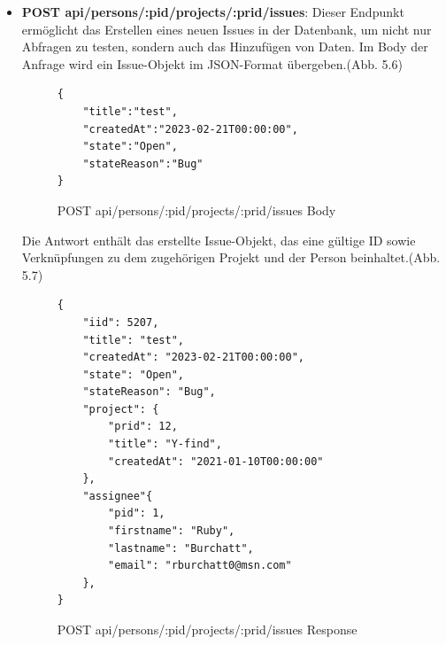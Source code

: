 \begin{itemize}
\item \textbf{POST api/persons/:pid/projects/:prid/issues}: Dieser Endpunkt ermöglicht das Erstellen eines neuen Issues in der Datenbank, um nicht nur Abfragen zu testen, sondern auch das Hinzufügen von Daten. Im Body der Anfrage wird ein Issue-Objekt im JSON-Format übergeben.(Abb. 5.6) 
\newline
\begin{figure}[H]
\begin{center}
\begin{BVerbatim}
{
    "title":"test",
    "createdAt":"2023-02-21T00:00:00",
    "state":"Open",
    "stateReason":"Bug"
}
\end{BVerbatim}
\end{center}
\caption{POST api/persons/:pid/projects/:prid/issues Body}
\end{figure}
Die Antwort enthält das erstellte Issue-Objekt, das eine gültige ID sowie Verknüpfungen zu dem zugehörigen Projekt und der Person beinhaltet.(Abb. 5.7)
\begin{figure}[H]
\begin{center}
\begin{BVerbatim}
{
    "iid": 5207,
    "title": "test",
    "createdAt": "2023-02-21T00:00:00",
    "state": "Open",
    "stateReason": "Bug",
    "project": {
        "prid": 12,
        "title": "Y-find",
        "createdAt": "2021-01-10T00:00:00"
    },
    "assignee"{
        "pid": 1,
        "firstname": "Ruby",
        "lastname": "Burchatt",
        "email": "rburchatt0@msn.com"
    },
}
\end{BVerbatim}
\end{center}
\caption{POST api/persons/:pid/projects/:prid/issues Response}
\end{figure}
\end{itemize}


